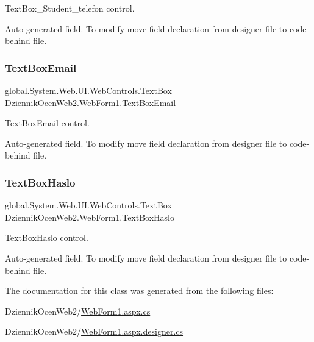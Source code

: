 Text\+Box\+\_\+\+Student\+\_\+telefon control. 

Auto-\/generated field. To modify move field declaration from designer file to code-\/behind file. \mbox{\label{class_dziennik_ocen_web2_1_1_web_form1_afd5c6cbba56f97163e3a77eacbe9f0c5}} 
\subsubsection{\texorpdfstring{Text\+Box\+Email}{TextBoxEmail}}
{\footnotesize\ttfamily global.\+System.\+Web.\+U\+I.\+Web\+Controls.\+Text\+Box Dziennik\+Ocen\+Web2.\+Web\+Form1.\+Text\+Box\+Email\hspace{0.3cm}{\ttfamily [protected]}}



Text\+Box\+Email control. 

Auto-\/generated field. To modify move field declaration from designer file to code-\/behind file. \mbox{\label{class_dziennik_ocen_web2_1_1_web_form1_a243a5ae21436ccb946bb3e2e9bc4ae42}} 
\subsubsection{\texorpdfstring{Text\+Box\+Haslo}{TextBoxHaslo}}
{\footnotesize\ttfamily global.\+System.\+Web.\+U\+I.\+Web\+Controls.\+Text\+Box Dziennik\+Ocen\+Web2.\+Web\+Form1.\+Text\+Box\+Haslo\hspace{0.3cm}{\ttfamily [protected]}}



Text\+Box\+Haslo control. 

Auto-\/generated field. To modify move field declaration from designer file to code-\/behind file. 

The documentation for this class was generated from the following files\+:\begin{DoxyCompactItemize}
\item 
Dziennik\+Ocen\+Web2/\hyperlink{_web_form1_8aspx_8cs}{Web\+Form1.\+aspx.\+cs}\item 
Dziennik\+Ocen\+Web2/\hyperlink{_web_form1_8aspx_8designer_8cs}{Web\+Form1.\+aspx.\+designer.\+cs}\end{DoxyCompactItemize}
